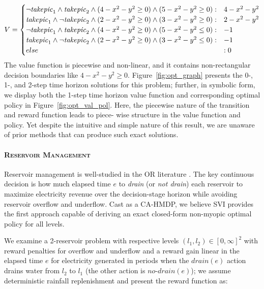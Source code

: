 \documentclass[twoside,11pt]{article}
\newcommand{\WaterReservoir}{\textsc{Reservoir Management }}
\begin{document}
{%
\begin{align*}
V = \begin{cases}
\neg \mathit{take\-pic}_1 \land \mathit{take\-pic}_2 \land (4 -x^2 -y^2\geq 0) \land 
(5 - x^2 - y^2\geq 0) : & 4 -x^2 -y^2 \\
\mathit{take\-pic}_1 \land \neg \mathit{take\-pic}_2 \land (2 -x^2 -y^2\geq 0) \land 
(3 - x^2 - y^2\geq 0) : & 2 -x^2 -y^2 \\
\neg \mathit{take\-pic}_1 \land \mathit{take\-pic}_2 \land (4 -x^2 -y^2\geq 0) \land 
(5 - x^2 - y^2\leq 0) : & -1 \\
\mathit{take\-pic}_1 \land \neg \mathit{take\-pic}_2 \land (2 -x^2 -y^2\geq 0) \land 
(3 - x^2 - y^2\leq 0) : & -1 \\
else &: 0 \\
\end{cases} 
\end{align*}
}
The value function is piecewise and non-linear, and it contains non-rectangular decision
boundaries like $4 -x^2 -y^2\geq 0$. Figure~\ref{fig:opt_graph} presents the  0-, 1-, and 2-step time horizon solutions for this problem; further, in symbolic form, we display both the 1-step time horizon value function and corresponding optimal policy in Figure~\ref{fig:opt_val_pol}. Here, the piecewise nature of the transition and reward function leads to piece- wise structure in the value function and policy. Yet despite the intuitive and simple nature of this result, we are unaware of prior methods that can produce such exact solutions. 

\paragraph{\WaterReservoir} 
Reservoir management is well-studied in
the OR literature \cite{Mahootchi2009,Yeh1985}.  The key continuous decision is how
much elapsed time $e$ to
\emph{drain} (or \emph{not drain}) each reservoir to maximize
electricity revenue over the decision-stage horizon while avoiding
reservoir overflow and underflow.  Cast as a CA-HMDP, we 
believe SVI provides the first approach capable of deriving
an exact closed-form non-myopic optimal policy
for all levels.

We examine a 2-reservoir problem with
respective levels $(l_1,l_2)\in [0,\infty]^2$ with reward penalties for 
overflow and underflow and a reward gain linear in the elapsed time $e$ for
electricity generated in periods when the $\mathit{drain}(e)$ action
drains water from $l_2$ to $l_1$ (the other action is 
$\mathit{no}$-$\mathit{drain}(e)$); we assume deterministic rainfall
replenishment and present the reward function as:  
\end{document}
